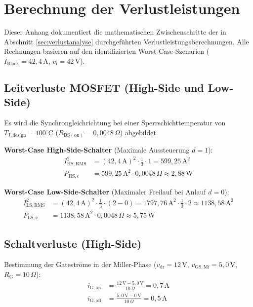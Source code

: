 \section{Berechnung der Verlustleistungen}
\label{app:verlustrechnung}

Dieser Anhang dokumentiert die mathematischen Zwischenschritte der in Abschnitt \ref{sec:verlustanalyse} durchgeführten Verlustleistungsberechnungen. Alle Rechnungen basieren auf den identifizierten Worst-Case-Szenarien ($I_{\mathrm{Block}} = 42{,}4\,\mathrm{A}$, $v_{\mathrm{i}} = 42\,\mathrm{V}$).

\subsection{Leitverluste MOSFET (High-Side und Low-Side)}
Es wird die Synchrongleichrichtung bei einer Sperrschichttemperatur von $T_{\mathrm{J,design}} = 100^\circ\mathrm{C}$ ($R_{\mathrm{DS(on)}} = 0{,}0048\,\Omega$) abgebildet. 

\textbf{Worst-Case High-Side-Schalter} (Maximale Aussteuerung $d=1$):
\begin{align}
    I_{\mathrm{HS,RMS}}^2 &= (42{,}4\,\mathrm{A})^2 \cdot \frac{1}{3} \cdot 1 = 599{,}25\,\mathrm{A}^2 \\
    P_{\mathrm{HS,c}} &= 599{,}25\,\mathrm{A}^2 \cdot 0{,}0048\,\Omega \approx 2{,}88\,\mathrm{W}
\end{align}

\textbf{Worst-Case Low-Side-Schalter} (Maximaler Freilauf bei Anlauf $d=0$):
\begin{align}
    I_{\mathrm{LS,RMS}}^2 &= (42{,}4\,\mathrm{A})^2 \cdot \frac{1}{3} \cdot (2 - 0) = 1797{,}76\,\mathrm{A}^2 \cdot \frac{1}{3} \cdot 2 \approx 1138{,}58\,\mathrm{A}^2 \\
    P_{\mathrm{LS,c}} &= 1138{,}58\,\mathrm{A}^2 \cdot 0{,}0048\,\Omega \approx 5{,}75\,\mathrm{W}
\end{align}

\subsection{Schaltverluste (High-Side)}
Bestimmung der Gateströme in der Miller-Phase ($v_{\mathrm{dr}} = 12\,\mathrm{V}$, $v_{\mathrm{GS,Mi}} = 5{,}0\,\mathrm{V}$, $R_{\mathrm{G}} = 10\,\Omega$):
\begin{align}
    i_{\mathrm{G,on}} &= \frac{12\,\mathrm{V} - 5{,}0\,\mathrm{V}}{10\,\Omega} = 0{,}7\,\mathrm{A} \\
    i_{\mathrm{G,off}} &= \frac{5{,}0\,\mathrm{V} - 0\,\mathrm{V}}{10\,\Omega} = 0{,}5\,\mathrm{A}
\end{align}

